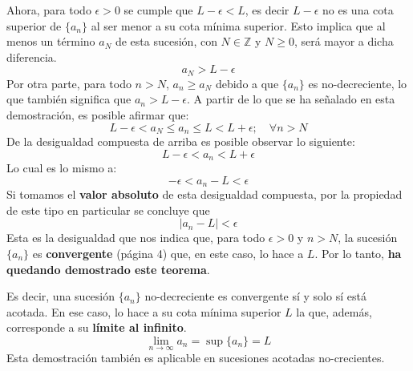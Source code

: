 \documentclass[12pt]{article}
\begin{document}
Ahora, para todo $\epsilon > 0$ se cumple que $L - \epsilon < L$, es decir $L - \epsilon$ no es una cota superior de $\{a_{n}\}$ al ser menor a su cota mínima superior. Esto implica que al menos un término $a_{N}$ de esta sucesión, con $N \in \mathbb{Z}$ y $N \geq 0$, será mayor a dicha diferencia.
\[
  a_{N} > L - \epsilon
\]
Por otra parte, para todo $n > N$, $a_{n} \geq a_{N}$ debido a que $\{a_{n}\}$ es no-decreciente, lo que también significa que $a_{n} > L - \epsilon$. A partir de lo que se ha señalado en esta demostración, es posible afirmar que:
\[
  L - \epsilon < a_{N} \leq a_{n} \leq L < L + \epsilon; \quad \forall n > N
\]
De la desigualdad compuesta de arriba es posible observar lo siguiente:
\[
  L - \epsilon < a_{n} < L + \epsilon
\]
Lo cual es lo mismo a:
\[
  - \epsilon < a_{n} - L < \epsilon
\]
Si tomamos el \textbf{valor absoluto} de esta desigualdad compuesta, por la propiedad de este tipo en particular se concluye que
\[
  |a_{n} - L| < \epsilon
\]
Esta es la desigualdad que nos indica que, para todo $\epsilon > 0$ y $n > N$, la sucesión $\{a_{n}\}$ es \textbf{convergente} (página 4) que, en este caso, lo hace a $L$. Por lo tanto, \textbf{ha quedando demostrado este teorema}.

Es decir, una sucesión $\{a_{n}\}$ no-decreciente es convergente sí y solo sí está acotada. En ese caso, lo hace a su cota mínima superior $L$ la que, además, corresponde a su \textbf{límite al infinito}.
\[
  \lim_{n \to \infty} a_{n} = \sup\{a_{n}\} = L
\]
Esta demostración también es aplicable en sucesiones acotadas no-crecientes.
\end{document}
